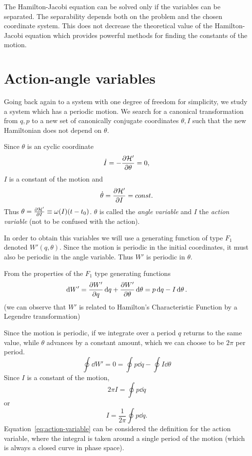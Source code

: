 \documentclass[../thesis.tex]{subfiles}
\theoremstyle{plain}
\begin{document}
The Hamilton-Jacobi equation can be solved only if the variables can be separated.
The separability depends both on the problem and the chosen coordinate system.
This does not decrease the theoretical value of the Hamilton-Jacobi equation which provides
powerful methods for finding the constants of the motion.

\section{Action-angle variables}

Going back again to a system with one degree of freedom for simplicity, we study a system
which has a periodic motion. We search for a canonical transformation from \(q,p\) to
a new set of canonically conjugate coordinates \(\theta, I\) such that the new
Hamiltonian does not depend on \(\theta \).

Since \(\theta \) is an cyclic coordinate
\[
  \dot{I} = -\pdv{\mathcal{H'}}{\theta} = 0,
\]
\(I\) is a constant of the motion and
\[
  \dot{\theta} = \pdv{\mathcal{H'}}{I} = const.
\]
Thus \(\theta = \pdv{\mathcal{H'}}{I} (t-t_0) \equiv \omega(I) (t-t_0)\).
\(\theta \) is called the \emph{angle variable} and \(I\) the \emph{action variable}
(not to be confused with the action).

In order to obtain this variables we will use a generating function of type \(F_1\)
denoted \(W'(q,\theta)\). Since the motion is periodic in the initial coordinates, it
must also be periodic in the angle variable. Thus \(W'\) is periodic in \(\theta \).

From the properties of the \(F_1\) type generating functions
\[
  \dd{W'} = \pdv{W'}{q} \dd{q} + \pdv{W'}{\theta} \dd{\theta} = p \dd{q} - I \dd{\theta}.
\]
(we can observe that \(W'\) is related to Hamilton's Characteristic Function by a
Legendre transformation)

Since the motion is periodic, if we integrate over a period \(q\) returns to the same
value, while \(\theta \) advances by a constant amount, which we can choose to be
\(2\pi \) per period.
\[
  \oint \dd{W'} = 0 = \oint p \dd{q} - \oint I \dd{\theta}
\]
Since \(I\) is a constant of the motion,
\[
  2\pi I = \oint p \dd{q}
\]
or
\begin{equation}
  \label{eq:action-variable}
  I = \frac{1}{2\pi} \oint p \dd{q}.
\end{equation}
Equation~\eqref{eq:action-variable} can be considered the definition for the
action variable, where the integral is taken around a single period of the motion
(which is always a closed curve in phase space).
\end{document}
